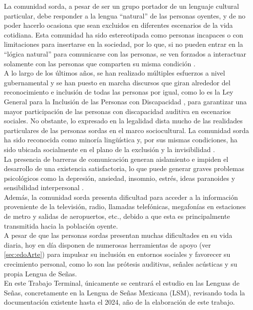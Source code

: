 La comunidad sorda, a pesar de ser un grupo portador de un lenguaje cultural particular, debe responder a la lengua “natural” de las personas oyentes, y de no poder hacerlo ocasiona que sean excluidos en diferentes escenarios de la vida cotidiana. Esta comunidad ha sido estereotipada como personas incapaces o con limitaciones para insertarse en la sociedad, por lo que, si no pueden entrar en la “lógica natural” para comunicarse con las personas, se ven forzados a interactuar solamente con las personas que comparten su misma condición \cite{ref32}.\\

A lo largo de los últimos años, se han realizado múltiples esfuerzos a nivel gubernamental y se han puesto en marcha discursos que giran alrededor del reconocimiento e inclusión de todas las personas por igual, como lo es la Ley General para la Inclusión de las Personas con Discapacidad \cite{ref37}, para garantizar una mayor participación de las personas con discapacidad auditiva en escenarios sociales. No obstante, lo expresado en la legalidad dista mucho de las realidades particulares de las personas sordas en el marco sociocultural. La comunidad sorda ha sido reconocida como minoría lingüística y, por sus mismas condiciones, ha sido ubicada socialmente en el plano de la exclusión y la invisibilidad \cite{ref32}. \\ 

La presencia de barreras de comunicación generan aislamiento e impiden el desarrollo de una existencia satisfactoria, lo que puede generar graves problemas psicológicos como la depresión, ansiedad, insomnio, estrés, ideas paranoides y sensibilidad interpersonal \cite{ref27}.\\

Además, la comunidad sorda presenta dificultad para acceder a la información proveniente de la televisión, radio, llamadas telefónicas, megafonías en estaciones de metro y salidas de aeropuertos, etc., debido a que esta es principalmente transmitida hacia la población oyente.\\

A pesar de que las personas sordas presentan muchas dificultades en su vida diaria, hoy en día disponen de numerosas herramientas de apoyo (ver \autoref{sec:edoArte}) para impulsar su inclusión en entornos sociales y favorecer su crecimiento personal, como lo son las prótesis auditivas, señales acústicas y su propia Lengua de Señas. \\

En este Trabajo Terminal, únicamente se centrará el estudio en las Lenguas de Señas, concretamente en la Lengua de Señas Mexicana (LSM), revisando toda la documentación existente hasta el 2024, año de la elaboración de este trabajo.\\

